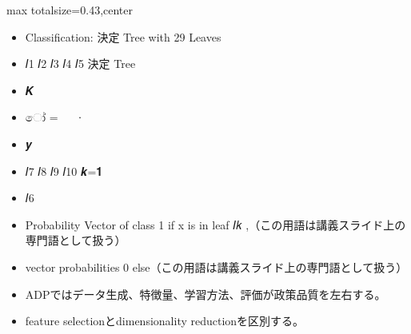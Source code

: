\clearpage
{}
\begin{minipage}[t]{0.405\textwidth}
\begin{adjustbox}{max totalsize={\textwidth}{0.43\textheight},center}
\begin{minipage}{\textwidth}\scriptsize
{}\begin{itemize}
\item Classification: 決定 Tree with 29 Leaves
\item 𝐼1 𝐼2 𝐼3 𝐼4 𝐼5 決定 Tree
\item 𝑲
\item ෝ = ෍ 𝒑𝒌 ∙ 𝕀 𝒙∈𝑰𝒌
\item 𝒚
\item 𝐼7 𝐼8 𝐼9 𝐼10 𝒌=𝟏
\item 𝐼6
\item Probability Vector of class 1 if x is in leaf 𝐼𝑘 ,（この用語は講義スライド上の専門語として扱う）
\item vector probabilities 0 else（この用語は講義スライド上の専門語として扱う）
\end{itemize}\begin{itemize}
\item ADPではデータ生成、特徴量、学習方法、評価が政策品質を左右する。
\item feature selectionとdimensionality reductionを区別する。
\end{itemize}
\end{minipage}
\end{adjustbox}
\end{minipage}\hfill
